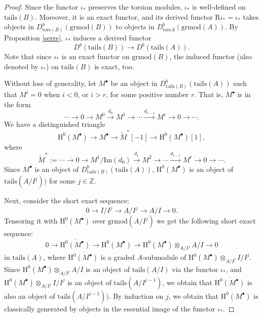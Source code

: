 \documentclass[11pt,reqno]{amsart}
\theoremstyle{definition}
\begin{document}
\begin{proof}
Since the functor $\iota_{\ast}$ preserves the torsion modules, $\iota_{\ast}$  
is well-defined on $\mathrm{tails}(B)$. Moreover, it is 
an exact functor, and its derived functor $\mathrm{R}\iota_{\ast} = \iota_{\ast}$ 
takes objects in 
$D_{\mathrm{tors}(B)}^{b}(\mathrm{grmod}(B))$ to 
objects in
$D_{\mathrm{tors}{A}}^{b}
(\mathrm{grmod}(A))$. 
By Proposition \ref{serre}, $\iota_{\ast}$ induces a derived functor 
$$
D^{b}(\mathrm{tails}(B)) \rightarrow D^{b}(\mathrm{tails}(A)).  
$$
Note that since $\iota_{\ast}$ is an exact functor on $\mathrm{grmod}(B)$,
the induced functor (also denoted by $\iota_{\ast}$) on $\mathrm{tails}(B)$ is exact, too. 

Without loss of
generality, let $M^{\bullet}$ be an object in  $D_{\mathrm{tails}(B)}^{b}(\mathrm{tails}(A))$ 
such that $M^{i} = 0$ when $i < 0$, or $i > r$, for some positive number $r$.
That is, $M^{\bullet}$ is in the form
$$
\cdots \longrightarrow 0 \longrightarrow M^0 \stackrel{d_0}\longrightarrow M^1 
\longrightarrow \cdots \stackrel{d_{r-1}}
\longrightarrow M^{r} \longrightarrow 0 \longrightarrow \cdots .
$$ 
We have a distinguished triangle
$$
\mathrm{H}^{0}(M^{\bullet}) 
\longrightarrow M^{\bullet} 
\longrightarrow \tilde{M}^{\ast}[-1] 
\longrightarrow \mathrm{H}^{0}
(M^{\bullet})[1],
$$
where 
$$\widetilde{M}^{\ast} := 
\cdots \longrightarrow 0 \longrightarrow M^1 / \mathrm{Im}(d_0) \stackrel{d_1}\longrightarrow 
M^2 \longrightarrow \cdots \stackrel{d_{r-1}}
\longrightarrow M^{r} \longrightarrow 0 \longrightarrow \cdots.
$$
Since $M^{\bullet}$ is an object of $D_{\mathrm{tails}(B)}^{b}(\mathrm{tails}(A))$, 
$\mathrm{H}^{0}(M^{\bullet})$ is an object of $\mathrm{tails}(A / I^j))$ 
for some $j \in \mathbb{Z}$. 

Next, 
consider the short exact sequence:
$$
0 \longrightarrow I / I^{j} \longrightarrow  A/ I^{j}   \longrightarrow  A/ I \longrightarrow 0.
$$
Tensoring it with 
$\mathrm{H}^{0}(M^{\bullet})$ over $\mathrm{grmod}(A / I^{j})$
we get the following short exact sequence:
$$
0 \longrightarrow \overline{\mathrm{H}^{0}(M^{\bullet})}  \longrightarrow \mathrm{H}^{0}(M^{\bullet}) 
\longrightarrow \mathrm{H}^{0}(M^{\bullet}) \otimes_{A / I^j} A / I \longrightarrow 0  
$$
in $\mathrm{tails}(A)$,
where
$\overline{\mathrm{H}^{0}(M^{\bullet})}$ is a graded $A$-submodule 
of $\mathrm{H}^{0}(M^{\bullet}) \otimes_{A / I^j} I / I^j$. 
Since $\mathrm{H}^{0}(M^{\bullet}) \otimes_{A / I^j} A / I$ is an object of  
$\mathrm{tails}(A / I)$ 
via the 
functor $\iota_{\ast}$, and $ \mathrm{H}^{0}(M^{\bullet}) \otimes_{A / I^{j}} I / I^{j}$ is an object of 
$\mathrm{tails}(A / I^{j - 1})$,
we obtain that
$\overline{\mathrm{H}^{0}(M^{\bullet})}$ is also an object of $\mathrm{tails}(A / I^{j - 1}))$. 
By induction on $j$, we obtain that $\mathrm{H}^{0}(M^{\bullet})$ 
is classically generated 
by objects in the essential image of the functor $\iota_{\ast}$. 


\end{proof}
\end{document}
